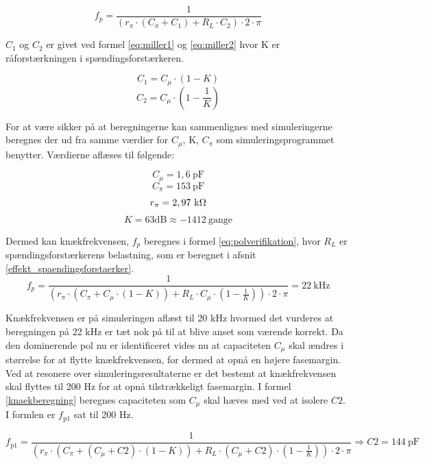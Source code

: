 \begin{equation}
f_p=\frac{1}{(r_\pi \cdot (C_\pi + C_1) + R_L \cdot C_2) \cdot 2 \cdot \pi}
\label{eq:knaekberegning_openloop}
\end{equation}

$C_1$ og $C_2$ er givet ved formel \ref{eq:miller1} og \ref{eq:miller2} hvor K er råforstærkningen i spændingsforstærkeren.

\begin{equation}
C_1=C_\mu \cdot \left( 1-K \right)
\label{eq:miller1}
\end{equation}
\begin{equation}
C_2=C_\mu \cdot \left( 1-\frac{1}{K} \right)
\label{eq:miller2}
\end{equation}

For at være sikker på at beregningerne kan sammenlignes med simuleringerne beregnes der ud fra samme værdier for $C_\mu$, K, $C_\pi$ som simuleringsprogrammet benytter. Værdierne aflæses til følgende: 

\[ C_\mu=1,6~\mathrm{pF} \]
\[ C_\pi=153~\mathrm{pF} \]
\[ r_\pi=2,97~\mathrm{k}\ohm \]
\[ K=63 \mathrm{dB} \approx -1412~\mathrm{gange}\]

Dermed kan knækfrekvensen, $f_p$ beregnes i formel \ref{eq:polverifikation}, hvor $R_L$ er spændingsforstærkerens belastning, som er beregnet i afsnit \ref{effekt_spaendingsforstaerker}.
\begin{equation}
f_p=\frac{1}{(r_\pi \cdot (C_\pi + C_\mu \cdot \left( 1-K \right)) + R_L \cdot C_\mu \cdot \left( 1-\frac{1}{K} \right)) \cdot 2 \cdot \pi}=22~\mathrm{kHz}
\label{eq:polverifikation}
\end{equation}

Knækfrekvensen er på simuleringen aflæst til 20 kHz hvormed det vurderes at beregningen på 22 kHz er tæt nok på til at blive anset som værende korrekt. 
Da den dominerende pol nu er identificeret vides nu at capaciteten $C_\mu$ skal ændres i størrelse for at flytte knækfrekvensen, for dermed at opnå en højere fasemargin. Ved at resonere over simuleringsresultaterne er det bestemt at knækfrekvensen skal flyttes til 200 Hz for at opnå tilstrækkeligt fasemargin. I formel \ref{knaekberegning} beregnes capaciteten som $C_\mu$ skal hæves med ved at isolere $C2$. I formlen er $f_\mathrm{p1}$ sat til 200 Hz. 

\begin{equation}
f_\mathrm{p1}=\frac{1}{(r_\pi \cdot (C_\pi + (C_\mu + C2) \cdot \left( 1-K \right)) + R_L \cdot (C_\mu + C2) \cdot \left( 1-\frac{1}{K} \right)) \cdot 2 \cdot \pi} \Rightarrow C2=144~\mathrm{pF}
\label{knaekberegning}
\end{equation}

